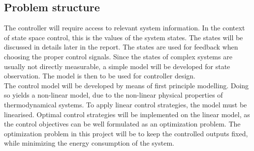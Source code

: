 \subsection{Problem structure}

The controller will require access to relevant system information. In the context of state space control, this is the values of the system states. The states will be discussed in details later in the report. The states are used for feedback when choosing the proper control signals. Since the states of complex systems are usually not directly measurable, a simple model will be developed for state observation. The model is then to be used for controller design. \\

The control model will be developed by means of first principle modelling. Doing so yields a non-linear model, due to the non-linear physical properties of thermodynamical systems. To apply linear control strategies, the model must be linearised. Optimal control strategies will be implemented on the linear model, as the control objectives can be well formulated as an optimization problem. The optimization problem in this project will be to keep the controlled outputs fixed, while minimizing the energy consumption of the system.\\


		
